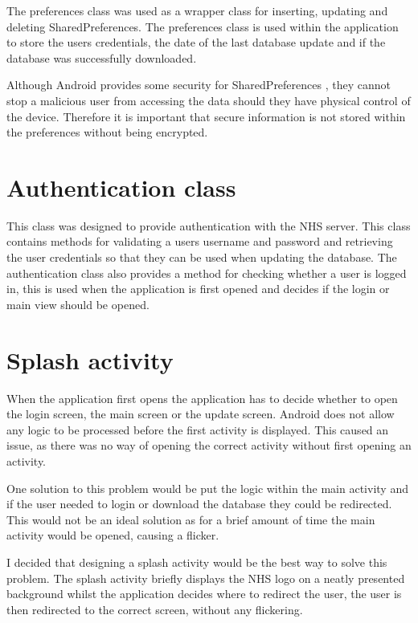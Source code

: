 The preferences class was used as a wrapper class for inserting, updating and deleting SharedPreferences. The preferences class is used within the application to store the users credentials, the date of the last database update and if the database was successfully downloaded.

Although Android provides some security for SharedPreferences \cite{shared_pref}, they cannot stop a malicious user from accessing the data should they have physical control of the device. Therefore it is important that secure information is not stored within the preferences without being encrypted.

\section{Authentication class}

This class was designed to provide authentication with the NHS server. This class contains methods for validating a users username and password and retrieving the user credentials so that they can be used when updating the database. The authentication class also provides a method for checking whether a user is logged in, this is used when the application is first opened and decides if the login or main view should be opened.

\section{Splash activity}
When the application first opens the application has to decide whether to open the login screen, the main screen or the update screen. Android does not allow any logic to be processed before the first activity is displayed. This caused an issue, as there was no way of opening the correct activity without first opening an activity.

One solution to this problem would be put the logic within the main activity and if the user needed to login or download the database they could be redirected. This would not be an ideal solution as for a brief amount of time the main activity would be opened, causing a flicker.

I decided that designing a splash activity would be the best way to solve this problem. The splash activity briefly displays the NHS \cite{nhs_website} logo on a neatly presented background whilst the application decides where to redirect the user, the user is then redirected to the correct screen, without any flickering.

